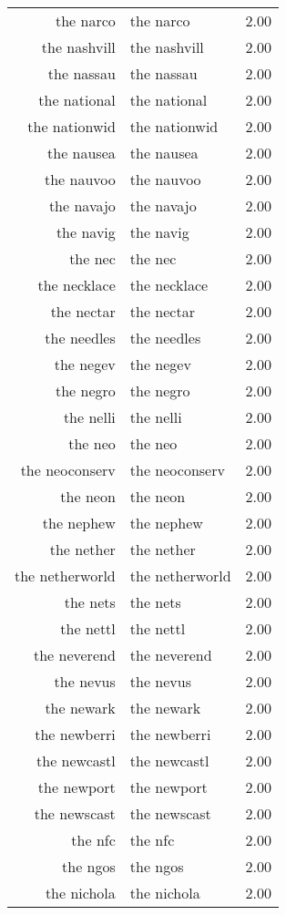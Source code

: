 \begin{table}[ht]
\begin{tabular}{rlr}
  the narco & the narco & 2.00 \\ 
  the nashvill & the nashvill & 2.00 \\ 
  the nassau & the nassau & 2.00 \\ 
  the national & the national & 2.00 \\ 
  the nationwid & the nationwid & 2.00 \\ 
  the nausea & the nausea & 2.00 \\ 
  the nauvoo & the nauvoo & 2.00 \\ 
  the navajo & the navajo & 2.00 \\ 
  the navig & the navig & 2.00 \\ 
  the nec & the nec & 2.00 \\ 
  the necklace & the necklace & 2.00 \\ 
  the nectar & the nectar & 2.00 \\ 
  the needles & the needles & 2.00 \\ 
  the negev & the negev & 2.00 \\ 
  the negro & the negro & 2.00 \\ 
  the nelli & the nelli & 2.00 \\ 
  the neo & the neo & 2.00 \\ 
  the neoconserv & the neoconserv & 2.00 \\ 
  the neon & the neon & 2.00 \\ 
  the nephew & the nephew & 2.00 \\ 
  the nether & the nether & 2.00 \\ 
  the netherworld & the netherworld & 2.00 \\ 
  the nets & the nets & 2.00 \\ 
  the nettl & the nettl & 2.00 \\ 
  the neverend & the neverend & 2.00 \\ 
  the nevus & the nevus & 2.00 \\ 
  the newark & the newark & 2.00 \\ 
  the newberri & the newberri & 2.00 \\ 
  the newcastl & the newcastl & 2.00 \\ 
  the newport & the newport & 2.00 \\ 
  the newscast & the newscast & 2.00 \\ 
  the nfc & the nfc & 2.00 \\ 
  the ngos & the ngos & 2.00 \\ 
  the nichola & the nichola & 2.00 \\ 

\end{tabular}
\end{table}
